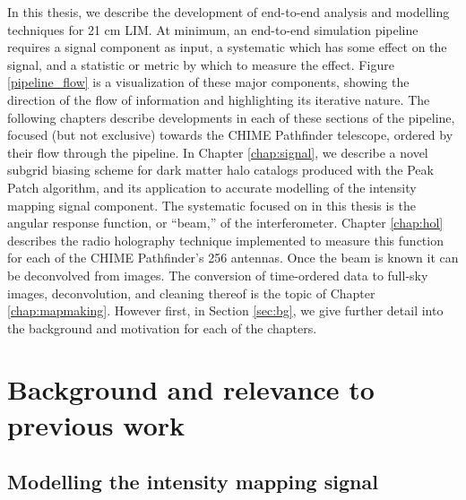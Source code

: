 In this thesis, we describe the development of end-to-end analysis and modelling techniques for 21 cm LIM. At minimum, an end-to-end simulation pipeline requires a signal component as input, a systematic which has some effect on the signal, and a statistic or metric by which to measure the effect. Figure \ref{pipeline_flow} is a visualization of these major components, showing the direction of the flow of information and highlighting its iterative nature. The following chapters describe developments in each of these sections of the pipeline, focused (but not exclusive) towards the CHIME Pathfinder telescope, ordered by their flow through the pipeline. In Chapter \ref{chap:signal}, we describe a novel subgrid biasing scheme for dark matter halo catalogs produced with the Peak Patch algorithm, and its application to accurate modelling of the intensity mapping signal component. The systematic focused on in this thesis is the angular response function, or ``beam,'' of the interferometer. Chapter \ref{chap:hol} describes the radio holography technique implemented to measure this function for each of the CHIME Pathfinder's 256 antennas. Once the beam is known it can be deconvolved from images. The conversion of time-ordered data to full-sky images, deconvolution, and cleaning thereof is the topic of Chapter \ref{chap:mapmaking}. However first, in Section \ref{sec:bg}, we give further detail into the background and motivation for each of the chapters.

\section{\label{sec:bg} Background and relevance to previous work}

\subsection{\label{sec:bg:subsec:signal} Modelling the intensity mapping signal}

